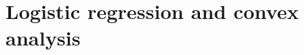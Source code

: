 \documentclass{../cs-classes/cs-classes}
\begin{document}
\section{Logistic regression and convex analysis}
%
%
\end{document}
